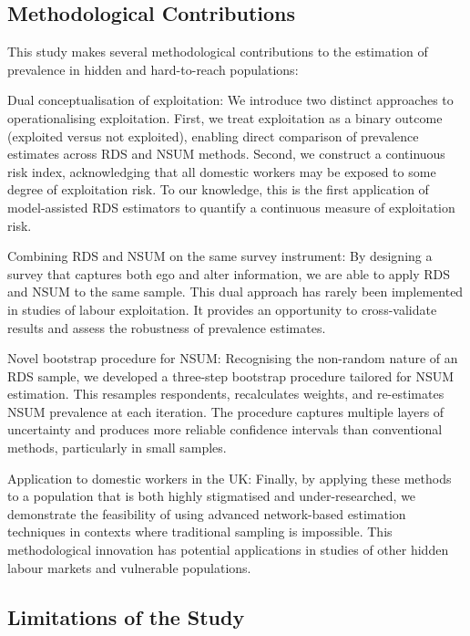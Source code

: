 \documentclass[
  12pt,
  letterpaper,
  DIV=11,
  numbers=noendperiod]{scrartcl}
\theoremstyle{plain}
\theoremstyle{definition}
\begin{document}
\subsection{Methodological
Contributions}\label{methodological-contributions}

This study makes several methodological contributions to the estimation
of prevalence in hidden and hard-to-reach populations:

Dual conceptualisation of exploitation: We introduce two distinct
approaches to operationalising exploitation. First, we treat
exploitation as a binary outcome (exploited versus not exploited),
enabling direct comparison of prevalence estimates across RDS and NSUM
methods. Second, we construct a continuous risk index, acknowledging
that all domestic workers may be exposed to some degree of exploitation
risk. To our knowledge, this is the first application of model-assisted
RDS estimators to quantify a continuous measure of exploitation risk.

Combining RDS and NSUM on the same survey instrument: By designing a
survey that captures both ego and alter information, we are able to
apply RDS and NSUM to the same sample. This dual approach has rarely
been implemented in studies of labour exploitation. It provides an
opportunity to cross-validate results and assess the robustness of
prevalence estimates.

Novel bootstrap procedure for NSUM: Recognising the non-random nature of
an RDS sample, we developed a three-step bootstrap procedure tailored
for NSUM estimation. This resamples respondents, recalculates weights,
and re-estimates NSUM prevalence at each iteration. The procedure
captures multiple layers of uncertainty and produces more reliable
confidence intervals than conventional methods, particularly in small
samples.

Application to domestic workers in the UK: Finally, by applying these
methods to a population that is both highly stigmatised and
under-researched, we demonstrate the feasibility of using advanced
network-based estimation techniques in contexts where traditional
sampling is impossible. This methodological innovation has potential
applications in studies of other hidden labour markets and vulnerable
populations.

\subsection{Limitations of the Study}\label{limitations-of-the-study}
\end{document}
